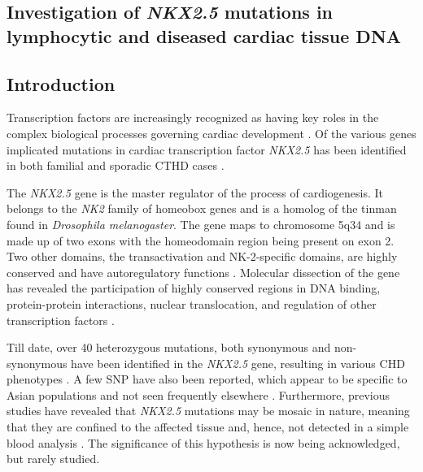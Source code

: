\begin{refsection}

\chapter{Investigation of \textit{NKX2.5} mutations in lymphocytic and diseased cardiac tissue DNA}
\label{Chapter5}

\section{Introduction}
Transcription factors are increasingly recognized as having key roles in the complex biological processes governing cardiac development \cite{akazawa2005cardiac,benson1999mutations}. Of the various genes implicated mutations in cardiac transcription factor \textit{NKX2.5} has been identified in both familial and sporadic CTHD cases \cite{goldmuntz2001nkx2,reamon2004somatic,reamon2004novel}.

The \textit{NKX2.5} gene is the master regulator of the process of cardiogenesis. It belongs to the \textit{NK2} family of homeobox genes and is a homolog of the tinman found in \textit{Drosophila melanogaster}. The gene maps to chromosome 5q34 and is made up of two exons with the homeodomain region being present on exon 2. Two other domains, the transactivation and NK-2-speciﬁc domains, are highly conserved and have autoregulatory functions \cite{inga2005functional}. Molecular dissection of the gene has revealed the participation of highly conserved regions in DNA binding, protein-protein interactions, nuclear translocation, and regulation of other transcription factors \cite{grow1998tinman,kasahara2004biochemical,kasahara2000loss,kasahara2001progressive}.

Till date, over 40 heterozygous mutations, both synonymous and non-synonymous have been identified in the \textit{NKX2.5} gene, resulting in various CHD phenotypes \cite{reamon2004somatic,reamon2004novel,mcelhinney2003nkx2}. A few SNP have also been reported, which appear to be specific to Asian populations and not seen frequently elsewhere \cite{dinesh2010single}. Furthermore, previous studies have revealed that \textit{NKX2.5} mutations may be mosaic in nature, meaning that they are confined to the affected tissue and, hence, not detected in a simple blood analysis \cite{reamon2004somatic,reamon2004novel}. The significance of this hypothesis is now being acknowledged, but rarely studied.


\end{refsection}

